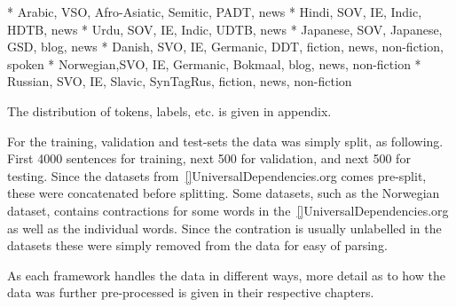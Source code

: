 * Arabic,   VSO, Afro-Asiatic, Semitic, PADT, news
* Hindi,    SOV, IE, Indic,             HDTB, news
* Urdu,     SOV, IE, Indic,             UDTB, news
* Japanese, SOV, Japanese,              GSD, blog, news
* Danish,   SVO, IE, Germanic,          DDT, fiction, news, non-fiction, spoken
* Norwegian,SVO, IE, Germanic,          Bokmaal, blog, news, non-fiction
* Russian,  SVO, IE, Slavic,            SynTagRus, fiction, news, non-fiction

The distribution of tokens, labels, etc. is given in appendix.

For the training, validation and test-sets the data was simply split, as following. 
First 4000 sentences for training, next 500 for validation, and next 500 for testing.
Since the datasets from~\ref{}{UniversalDependencies.org} comes pre-split, these were concatenated before splitting.
Some datasets, such as the Norwegian dataset, contains contractions for some words in the~\ref{}{UniversalDependencies.org} as well as the individual words.
Since the contration is usually unlabelled in the datasets these were simply removed from the data for easy of parsing.

As each framework handles the data in different ways, more detail as to how the data was further pre-processed is given in their respective chapters.
